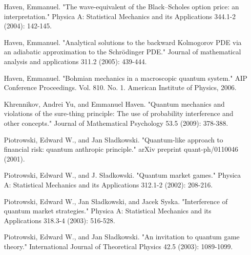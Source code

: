 \documentclass[a4paper,titlepage,12pt,fleqn,oneside]{report}
\begin{document}
\begin{thebibliography}{99}
\begin{LTRitems}
	Haven, Emmanuel. "The wave-equivalent of the Black–Scholes option price: an interpretation." Physica A: Statistical Mechanics and its Applications 344.1-2 (2004): 142-145.
\end{LTRitems}

\begin{LTRitems}
	Haven, Emmanuel. "Analytical solutions to the backward Kolmogorov PDE via an adiabatic approximation to the Schrödinger PDE." Journal of mathematical analysis and applications 311.2 (2005): 439-444.
\end{LTRitems}

\begin{LTRitems}
	Haven, Emmanuel. "Bohmian mechanics in a macroscopic quantum system." AIP Conference Proceedings. Vol. 810. No. 1. American Institute of Physics, 2006.
\end{LTRitems}

\begin{LTRitems}
	Khrennikov, Andrei Yu, and Emmanuel Haven. "Quantum mechanics and violations of the sure-thing principle: The use of probability interference and other concepts." Journal of Mathematical Psychology 53.5 (2009): 378-388.
\end{LTRitems}

\begin{LTRitems}
	Piotrowski, Edward W., and Jan Sładkowski. "Quantum-like approach to financial risk: quantum anthropic principle." arXiv preprint quant-ph/0110046 (2001).
\end{LTRitems}

\begin{LTRitems}
	Piotrowski, Edward W., and J. Sładkowski. "Quantum market games." Physica A: Statistical Mechanics and its Applications 312.1-2 (2002): 208-216.
\end{LTRitems}

\begin{LTRitems}
	Piotrowski, Edward W., Jan Sładkowski, and Jacek Syska. "Interference of quantum market strategies." Physica A: Statistical Mechanics and its Applications 318.3-4 (2003): 516-528.
\end{LTRitems}

\begin{LTRitems}
	Piotrowski, Edward W., and Jan Sładkowski. "An invitation to quantum game theory." International Journal of Theoretical Physics 42.5 (2003): 1089-1099.
\end{LTRitems}


\end{thebibliography}
\end{document}
